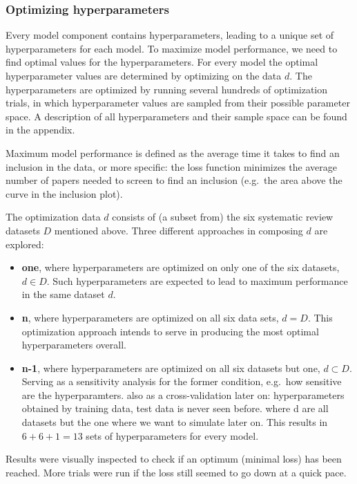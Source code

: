 \documentclass[
]{article}
\providecommand{\tightlist}{%
  \setlength{\itemsep}{0pt}\setlength{\parskip}{0pt}}
\begin{document}
\hypertarget{optimizing-hyperparameters}{%
\subsubsection{Optimizing
hyperparameters}\label{optimizing-hyperparameters}}

Every model component contains hyperparameters, leading to a unique set
of hyperparameters for each model. To maximize model performance, we
need to find optimal values for the hyperparameters. For every model the
optimal hyperparameter values are determined by optimizing on the data
\(d\). The hyperparameters are optimized by running several hundreds of
optimization trials, in which hyperparameter values are sampled from
their possible parameter space. A description of all hyperparameters and
their sample space can be found in the appendix.

Maximum model performance is defined as the average time it takes to
find an inclusion in the data, or more specific: the loss function
minimizes the average number of papers needed to screen to find an
inclusion (e.g.~the area above the curve in the inclusion plot).

The optimization data \(d\) consists of (a subset from) the six
systematic review datasets \(D\) mentioned above. Three different
approaches in composing \(d\) are explored:

\begin{itemize}
\tightlist
\item
  \textbf{one}, where hyperparameters are optimized on only one of the
  six datasets, \(d \in D\). Such hyperparameters are expected to lead
  to maximum performance in the same dataset \(d\).
\item
  \textbf{n}, where hyperparameters are optimized on all six data sets,
  \(d = D\). This optimization approach intends to serve in producing
  the most optimal hyperparameters overall.
\item
  \textbf{n-1}, where hyperparameters are optimized on all six datasets
  but one, \(d \subset D\). Serving as a sensitivity analysis for the
  former condition, e.g.~how sensitive are the hyperparamters. also as a
  cross-validation later on: hyperparameters obtained by training data,
  test data is never seen before. where d are all datasets but the one
  where we want to simulate later on. This results in \(6+6+1=13\) sets
  of hyperparameters for every model.
\end{itemize}

Results were visually inspected to check if an optimum (minimal loss)
has been reached. More trials were run if the loss still seemed to go
down at a quick pace.
\end{document}

